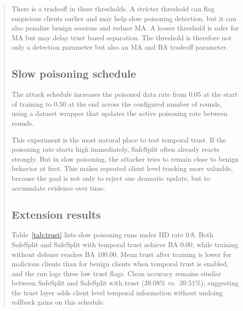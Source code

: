 \documentclass{article}
\begin{document}
\begin{abstract}
There is a tradeoff in these thresholds. A stricter threshold can flag suspicious clients earlier and may help slow poisoning detection, but it can also penalize benign sessions and reduce MA. A looser threshold is safer for MA but may delay trust based separation. The threshold is therefore not only a detection parameter but also an MA and BA tradeoff parameter.

\subsection{Slow poisoning schedule}

The attack schedule increases the poisoned data rate from $0.05$ at the start of training to $0.50$ at the end across the configured number of rounds, using a dataset wrapper that updates the active poisoning rate between rounds.

This experiment is the most natural place to test temporal trust. If the poisoning rate starts high immediately, SafeSplit often already reacts strongly. But in slow poisoning, the attacker tries to remain close to benign behavior at first. This makes repeated client level tracking more valuable, because the goal is not only to reject one dramatic update, but to accumulate evidence over time.

\subsection{Extension results}

Table~\ref{tab:trust} lists slow poisoning runs under IID rate $0.8$. Both SafeSplit and SafeSplit with temporal trust achieve BA $0.00$, while training without defense reaches BA $100.00$. Mean trust after training is lower for malicious clients than for benign clients when temporal trust is enabled, and the run logs three low trust flags. Clean accuracy remains similar between SafeSplit and SafeSplit with trust ($39.08\%$ vs.\ $39.51\%$), suggesting the trust layer adds client level temporal information without undoing rollback gains on this schedule.

\begin{table}[t]
  \caption{Slow poisoning experiment (IID rate $0.8$, attack schedule slow). Mal.\ / Ben.\ trust: mean trust for malicious vs.\ benign clients.}
  \label{tab:trust}
  \begin{center}
  \end{center}
\end{table}


\end{abstract}
\end{document}
